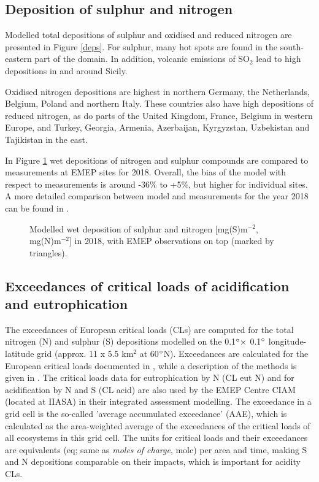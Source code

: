 \subsection{Deposition of sulphur and nitrogen} %
\label{subs:dep}

Modelled total depositions of sulphur and oxidised and reduced nitrogen are presented in Figure \ref{deps}.
For sulphur, many hot spots are found in the south-eastern part of the domain. In addition, volcanic emissions of SO$_2$ lead to high depositions in and around Sicily.

Oxidised nitrogen depositions are highest in northern Germany, the Netherlands, Belgium, Poland and northern Italy. These countries also have high depositions of reduced nitrogen, as do parts of the United Kingdom, France, Belgium in western Europe, and Turkey, Georgia, Armenia, Azerbaijan, Kyrgyzstan, Uzbekistan and Tajikistan in the east. 

In Figure \ref{wdeps} wet depositions of nitrogen and sulphur compounds are compared to measurements at EMEP sites for 2018. Overall, the bias of the model with respect to measurements is around 
-36\% to +5\%, but higher for individual sites. A more detailed comparison between model and measurements for the year 2018 can be found in \cite{WEB2020:SN}.

\begin{figure}[H]
  \centering
 \caption{Modelled wet deposition of sulphur and nitrogen [mg(S)m$^{-2}$, mg(N)m$^{-2}$] in 2018, with EMEP observations on top (marked by triangles).}
\label{wdeps}
\end{figure}

\subsection{Exceedances of critical loads of acidification and eutrophication}\label{subs:exceedSnN}

The exceedances of European critical loads (CLs) are computed for the total nitrogen
(N) and sulphur (S) depositions modelled on the 0.1$^\circ \times$ 0.1$^\circ$
longitude-latitude grid (approx. 11 x 5.5 km$^{2}$ at 60$^\circ$N).
Exceedances are calculated for the European critical loads documented in \cite{Hettelingh:2017}, while
a description of the methods is given in \cite{DeVries:2015}. The
critical loads data for eutrophication by N (CL eut N) and for acidification by N and S
(CL acid) are also used by the EMEP Centre CIAM (located at IIASA) in their integrated assessment
modelling. The exceedance in a grid cell is the so-called ’average accumulated
exceedance’ (AAE), which is calculated as the area-weighted average of the
exceedances of the critical loads of all ecosystems in this grid cell. The units for
critical loads and their exceedances are equivalents (eq; same as \textit{moles of charge},
molc) per area and time, making S and N depositions comparable on their impacts, which is important for
acidity CLs.

